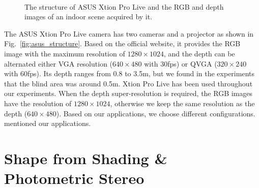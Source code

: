 \begin{figure}[!ht]
\centering
{}\\
\caption{The structure of ASUS Xtion Pro Live and the RGB and depth images of an indoor scene acquired by it.}
\label{fig:asus_illustration}
\end{figure}
The ASUS Xtion Pro Live camera has two cameras and a projector as shown in Fig.~\ref{fig:asus_structure}.
Based on the official website, it provides the RGB image with the maximum resolution of $1280\times1024$, and the depth can be alternated either VGA resolution ($640\times480$ with 30fps) or QVGA ($320\times240$ with 60fps). 
Its depth ranges from 0.8 to 3.5m, but we found in the experiments that the blind area was around 0.5m.  
Xtion Pro Live has been used throughout our experiments.
When the depth super-resolution is required, the RGB images have the resolution of $1280\times1024$, otherwise we keep the same resolution as the depth ($640\times480$).
Based on our applications, we choose different configurations. mentioned our applications.

\section{Shape from Shading \& Photometric Stereo}

